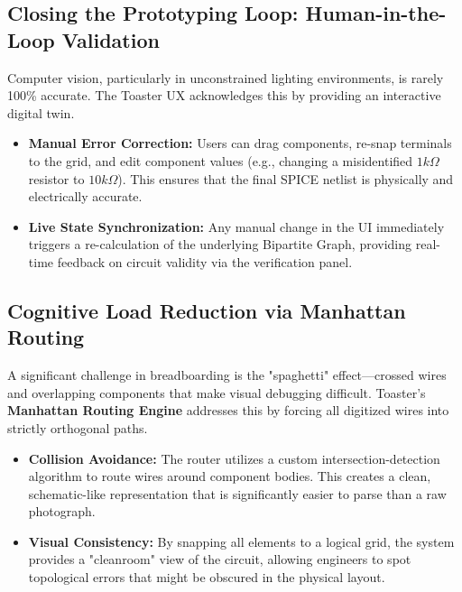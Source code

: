 \documentclass[11pt,a4paper]{article}
\begin{document}
\subsection{Closing the Prototyping Loop: Human-in-the-Loop Validation}
Computer vision, particularly in unconstrained lighting environments, is rarely 100\% accurate. The Toaster UX acknowledges this by providing an interactive digital twin.
\begin{itemize}
    \item \textbf{Manual Error Correction:} Users can drag components, re-snap terminals to the grid, and edit component values (e.g., changing a misidentified $1k\Omega$ resistor to $10k\Omega$). This ensures that the final SPICE netlist is physically and electrically accurate.
    \item \textbf{Live State Synchronization:} Any manual change in the UI immediately triggers a re-calculation of the underlying Bipartite Graph, providing real-time feedback on circuit validity via the verification panel.
\end{itemize}

\subsection{Cognitive Load Reduction via Manhattan Routing}
A significant challenge in breadboarding is the "spaghetti" effect—crossed wires and overlapping components that make visual debugging difficult. Toaster's \textbf{Manhattan Routing Engine} addresses this by forcing all digitized wires into strictly orthogonal paths.
\begin{itemize}
    \item \textbf{Collision Avoidance:} The router utilizes a custom intersection-detection algorithm to route wires around component bodies. This creates a clean, schematic-like representation that is significantly easier to parse than a raw photograph.
    \item \textbf{Visual Consistency:} By snapping all elements to a logical grid, the system provides a "cleanroom" view of the circuit, allowing engineers to spot topological errors that might be obscured in the physical layout.
\end{itemize}
\end{document}
